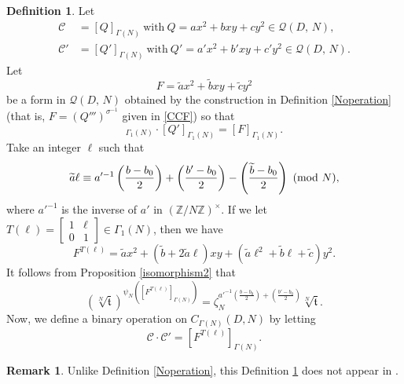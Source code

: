 \documentclass[reqno,11pt]{article}
\newcommand{\Mod}[1]{\ (\textup{mod}\ #1)}
\theoremstyle{plain} %
\theoremstyle{definition} %
\newtheorem{definition}[theorem]{\indent\sc Definition}
\newtheorem{remark}[theorem]{\indent\sc Remark}
\begin{document}
\begin{definition}\label{Noperation2}
Let
\begin{align*}
\mathcal{C}&=[Q]_{\Gamma(N)}~\textrm{with}~
Q=ax^2+bxy+cy^2\in\mathcal{Q}(D,\,N),\\
\mathcal{C}'&=[Q']_{\Gamma(N)}~\textrm{with}~
Q'=a'x^2+b'xy+c'y^2\in\mathcal{Q}(D,\,N).
\end{align*}
Let 
\begin{equation*}
F=\widetilde{a}x^2+\widetilde{b}xy+\widetilde{c}y^2
\end{equation*}
be a form in $\mathcal{Q}(D,\,N)$ obtained by the construction in Definition \ref{Noperation} 
(that is, $F=(Q''')^{\sigma^{-1}}$ given in \eqref{CCF}) so that
\begin{equation*}
[Q]_{\Gamma_1(N)}
\cdot[Q']_{\Gamma_1(N)}=[F]_{\Gamma_1(N)}.
\end{equation*}
Take an integer $\ell$ such that
\begin{equation*}
\widetilde{a}\ell
\equiv
a'^{-1}\left(\frac{b-b_0}{2}\right)
+\left(\frac{b'-b_0}{2}\right)-\left(\frac{\widetilde{b}-b_0}{2}\right)
\Mod{N},
\end{equation*}
where $a'^{-1}$ is the inverse of $a'$ in $(\mathbb{Z}/N\mathbb{Z})^\times$.
If we let $T(\ell)=\begin{bmatrix}
1 & \ell\\0 & 1\end{bmatrix}
\in\Gamma_1(N)$, then we have
\begin{equation*}
F^{T(\ell)}=\widetilde{a}x^2+(\widetilde{b}+2\widetilde{a}\ell)xy
+(\widetilde{a}\ell^2+\widetilde{b}\ell+\widetilde{c})y^2. 
\end{equation*} 
It follows from Proposition \ref{isomorphism2} that
\begin{equation*}
\left(\sqrt[N]{\mathfrak{t}}\right)^{\psi_N([F^{T(\ell)}]_{\Gamma(N)})}=
\zeta_N^{a'^{-1}\left(\frac{b-b_0}{2}\right)+\left(\frac{b'-b_0}{2}\right)}\sqrt[N]{\mathfrak{t}}. 
\end{equation*}
Now, we define a binary operation on $C_{\Gamma(N)}(D,N)$ by letting
\begin{equation*}
\mathcal{C}\cdot\mathcal{C}'=[F^{T(\ell)}]_{\Gamma(N)}.
\end{equation*}
\end{definition}

\begin{remark}
Unlike Definition \ref{Noperation}, this Definition \ref{Noperation2}
does not appear in \cite{J-K-S-Y}. 
\end{remark}
\end{document}

